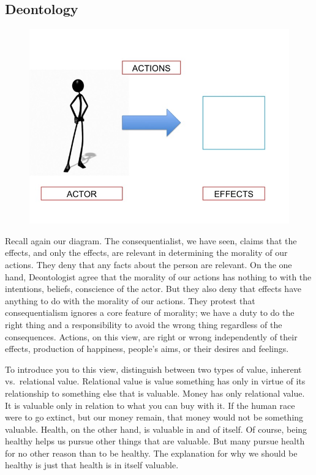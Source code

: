 \documentclass[9pt]{article}
\begin{document}
\subsection{Deontology}\label{deontology}

\begin{figure}[htbp]
\centering
\includegraphics{Slide1.jpg}
\end{figure}

Recall again our diagram. The consequentialist, we have seen, claims
that the effects, and only the effects, are relevant in determining the
morality of our actions. They deny that any facts about the person are
relevant. On the one hand, Deontologist agree that the morality of our
actions has nothing to with the intentions, beliefs, conscience of the
actor. But they also deny that effects have anything to do with the
morality of our actions. They protest that consequentialism ignores a
core feature of morality; we have a duty to do the right thing and a
responsibility to avoid the wrong thing regardless of the consequences.
Actions, on this view, are right or wrong independently of their
effects, production of happiness, people's aims, or their desires and
feelings.

To introduce you to this view, distinguish between two types of value,
inherent vs.~relational value. Relational value is value something has
only in virtue of its relationship to something else that is valuable.
Money has only relational value. It is valuable only in relation to what
you can buy with it. If the human race were to go extinct, but our money
remain, that money would not be something valuable. Health, on the other
hand, is valuable in and of itself. Of course, being healthy helps us
pursue other things that are valuable. But many pursue health for no
other reason than to be healthy. The explanation for why we should be
healthy is just that health is in itself valuable.
\end{document}
